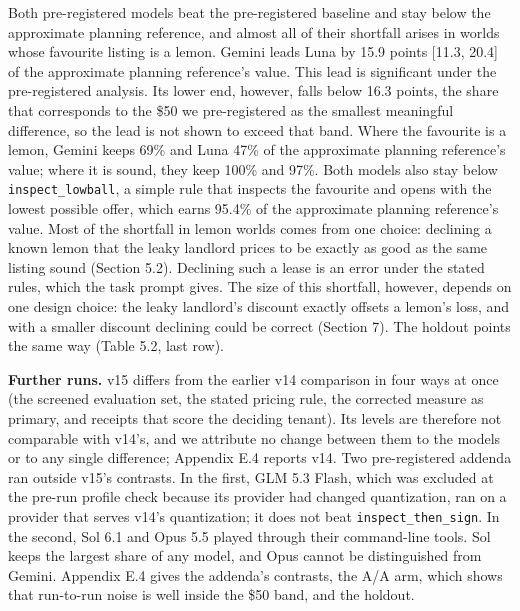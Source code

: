 Both pre-registered models beat the pre-registered baseline and stay below the approximate planning reference, and almost all
of their shortfall arises in worlds whose favourite listing is a lemon. Gemini leads Luna by 15.9 points {[}11.3, 20.4{]}
of the approximate planning reference's value. This lead is significant under the pre-registered analysis. Its lower end,
however, falls below 16.3 points, the share that corresponds to the \$50 we pre-registered as the smallest meaningful
difference, so the lead is not shown to exceed that band. Where the favourite is a lemon, Gemini keeps 69\% and Luna
47\% of the approximate planning reference's value; where it is sound, they keep 100\% and 97\%. Both models also stay below
\texttt{inspect\_\allowbreak{}lowball}, a simple rule that inspects the favourite and opens with the lowest possible offer, which earns
95.4\% of the approximate planning reference's value. Most of the shortfall in lemon worlds comes from one choice: declining a
known lemon that the leaky landlord prices to be exactly as good as the same listing sound (Section 5.2). Declining
such a lease is an error under the stated rules, which the task prompt gives. The size of this shortfall, however,
depends on one design choice: the leaky landlord's discount exactly offsets a lemon's loss, and with a smaller
discount declining could be correct (Section 7). The holdout points the
same way (Table 5.2, last row).

\textbf{Further runs.} v15 differs from the earlier v14 comparison in four ways at once (the screened evaluation set, the
stated pricing rule, the corrected measure as primary, and receipts that score the deciding tenant). Its levels are
therefore not comparable with v14's, and we attribute no change between them to the models or to any single
difference; Appendix E.4 reports v14. Two pre-registered addenda ran outside v15's contrasts. In the first, GLM 5.3
Flash, which was excluded at the pre-run profile check because its provider had changed quantization, ran on a
provider that serves v14's quantization; it does not beat \texttt{inspect\_\allowbreak{}then\_\allowbreak{}sign}. In the second, Sol 6.1 and Opus 5.5
played through their command-line tools. Sol keeps the largest share of any model, and Opus cannot be distinguished
from Gemini. Appendix E.4 gives the addenda's contrasts, the A/A arm, which shows that run-to-run noise is well inside the \$50 band, and the holdout.

